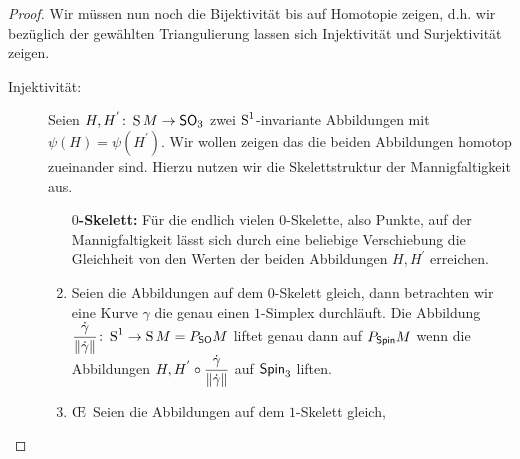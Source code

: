 \begin{Satz}
\begin{proof}
          Wir müssen nun noch die Bijektivität bis auf Homotopie zeigen,
          d.h. wir bezüglich der gewählten Triangulierung lassen sich
          Injektivität und Surjektivität zeigen.
          
          \begin{description}
	          	\item[Injektivität:] Seien $ \abb{H,H^{'}}{\S M}{\so_3} $
	          	zwei $ \S^1 $-invariante Abbildungen mit $ \psi(H)=\psi(H^{'}) $. Wir wollen zeigen das die beiden
	          	Abbildungen homotop zueinander sind. Hierzu nutzen wir
	          	die Skelettstruktur der Mannigfaltigkeit aus.
		          	\begin{enumerate}
		          		\item[$ 0 ${\bfseries-Skelett:}] Für die endlich vielen $ 0 $-Skelette, also
		          		Punkte, auf der Mannigfaltigkeit lässt sich durch
		          		eine beliebige Verschiebung die Gleichheit von
		          		den Werten der beiden Abbildungen $ H,H^{'} $
		          		erreichen.
		          		\item Seien die Abbildungen auf dem $ 0 $-Skelett
		          		gleich, dann betrachten wir eine Kurve $ \gamma $
		          		die genau einen $ 1 $-Simplex durchläuft.
		          		Die Abbildung $ \abb{\dfrac{\dot{\gamma}}{\norm{\dot{\gamma}}}}{\S^1}{\S M = \Ph{\so}{M}} $ liftet genau dann auf $ \Ph{\spin}{M} $ wenn die Abbildungen
		          		$ H,H^{'} \circ \dfrac{\dot{\gamma}}{\norm{\dot{\gamma}}} $ auf
		          		$ \spin_3 $ liften.
		          		
			          	\item \OE~Seien die Abbildungen auf dem $ 1 $-Skelett
			          	gleich, 
		          	\end{enumerate}
          \end{description}
          

\end{proof}
\end{Satz}
